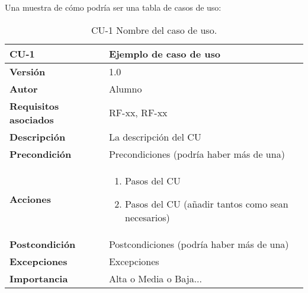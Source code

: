 Una muestra de cómo podría ser una tabla de casos de uso:

\begin{table}[p]
	\centering
	\begin{tabularx}{\linewidth}{ p{} p{} }
		\toprule
		\textbf{CU-1}    & \textbf{Ejemplo de caso de uso}\\
		\toprule
		\textbf{Versión}              & 1.0    \\
		\textbf{Autor}                & Alumno \\
		\textbf{Requisitos asociados} & RF-xx, RF-xx \\
		\textbf{Descripción}          & La descripción del CU \\
		\textbf{Precondición}         & Precondiciones (podría haber más de una) \\
		\textbf{Acciones}             &
		\begin{enumerate}
			\def\labelenumi{\arabic{enumi}.}
			\tightlist
			\item Pasos del CU
			\item Pasos del CU (añadir tantos como sean necesarios)
		\end{enumerate}\\
		\textbf{Postcondición}        & Postcondiciones (podría haber más de una) \\
		\textbf{Excepciones}          & Excepciones \\
		\textbf{Importancia}          & Alta o Media o Baja... \\
		\bottomrule
	\end{tabularx}
	\caption{CU-1 Nombre del caso de uso.}
\end{table}

